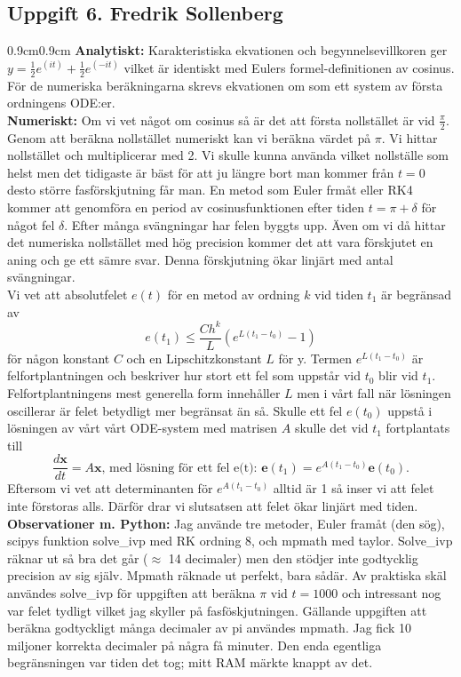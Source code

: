 \documentclass{article}
\begin{document}
\subsection*{Uppgift 6. Fredrik Sollenberg}
\begin{adjustwidth}{0.9cm}{0.9cm}
\textbf{Analytiskt:} Karakteristiska ekvationen och begynnelsevillkoren ger $y=\frac{1}{2} e^{(it)}+ \frac{1}{2} e^{(-it)}$ vilket är identiskt med Eulers formel-definitionen av cosinus. För de numeriska beräkningarna skrevs ekvationen om som ett system av första ordningens ODE:er. 
\medskip\\
\textbf{Numeriskt:}  Om vi vet något om cosinus så är det att första nollstället är vid $\frac{\pi}{2}$. Genom att beräkna nollstället numeriskt kan vi beräkna värdet på $\pi$. Vi hittar nollstället och multiplicerar med 2. Vi skulle kunna använda vilket nollställe som helst men det tidigaste är bäst för att ju längre bort man kommer från $t=0$ desto större fasförskjutning får man. En metod som Euler frmåt eller RK4 kommer att genomföra en period av cosinusfunktionen efter tiden $t=\pi+\delta$ för något fel $\delta$. Efter många svängningar har felen byggts upp. Även om vi då hittar det numeriska nollstället med hög precision kommer det att vara förskjutet en aning och ge ett sämre svar. Denna förskjutning ökar linjärt med antal svängningar.
\medskip\\
Vi vet att absolutfelet $e(t)$ för en metod av ordning $k$ vid tiden $t_1$ är begränsad av
\[
e(t_1) \leq \frac{Ch^{k}}{L}(e^{L(t_1-t_0)}-1)
\]
för någon konstant $C$ och en Lipschitzkonstant $L$ för y. Termen $e^{L(t_1-t_0)}$ är felfortplantningen och beskriver hur stort ett fel som uppstår vid $t_0$ blir vid $t_1$. Felfortplantningens mest generella form innehåller $L$ men i vårt fall när lösningen oscillerar är felet betydligt mer begränsat än så. Skulle ett fel $e(t_0)$ uppstå i lösningen av vårt vårt ODE-system med matrisen $A$ skulle det vid $t_1$ fortplantats till
\[
\frac{d\textbf{x}}{dt}=A\textbf{x} \text{,  med lösning för ett fel e(t):  } \textbf{e}(t_1) = e^{A(t_1-t_0)}\textbf{e}(t_0)\text{.}
\]
Eftersom vi vet att determinanten för $e^{A(t_1-t_0)}$ alltid är 1 så inser vi att felet inte förstoras alls. Därför drar vi slutsatsen att felet ökar linjärt med tiden. 
\medskip\\
\textbf{Observationer m. Python:} Jag använde tre metoder, Euler framåt (den sög), scipys funktion solve\_ivp med RK ordning 8, och mpmath med taylor. Solve\_ivp räknar ut så bra det går ($\approx$ 14 decimaler) men den stödjer inte godtycklig precision av sig själv. Mpmath räknade ut perfekt, bara sådär. Av praktiska skäl användes solve\_ivp för uppgiften att beräkna $\pi$ vid $t=1000$ och intressant nog var felet tydligt vilket jag skyller på fasföskjutningen. Gällande uppgiften att beräkna godtyckligt många decimaler av pi användes mpmath. Jag fick 10 miljoner korrekta decimaler på några få minuter. Den enda egentliga begränsningen var tiden det tog; mitt RAM märkte knappt av det.
\end{adjustwidth}
\end{document}
